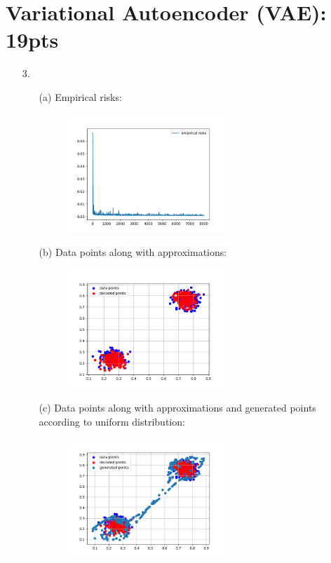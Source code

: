 \documentclass[12pt]{article}
\begin{document}
\section{Variational Autoencoder (VAE): 19pts}
\begin{enumerate}
    \item[3.]
    \begin{enumerate}
        \item[(a)] Empirical risks:
        \begin{figure}[h]
            \centering
            \includegraphics[width=0.6\textwidth]{5.3a}
        \end{figure}
        \item[(b)] Data points along with approximations:
        \begin{figure}[h]
            \centering
            \includegraphics[width=0.6\textwidth]{5.3b}
        \end{figure}
        \newpage
        \item[(c)] Data points along with approximations and generated points according to uniform distribution:
        \begin{figure}[h]
            \centering
            \includegraphics[width=0.6\textwidth]{5.3c}
        \end{figure}
    \end{enumerate}
\end{enumerate}
\end{document}
